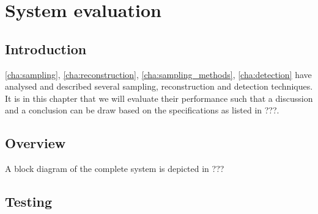 \documentclass[a4paper, openany, oneside]{memoir}
\begin{document}
\chapter{System evaluation}
\section{Introduction}

\cref{cha:sampling}, \cref{cha:reconstruction}, \cref{cha:sampling_methods}, \cref{cha:detection} have analysed and described several
sampling, reconstruction and detection techniques. It is in this chapter that we will evaluate their performance such that a discussion and a conclusion can be draw based on the specifications as listed in ???.

\section{Overview}
A block diagram of the complete system is depicted in ???

\section{Testing}
\end{document}
